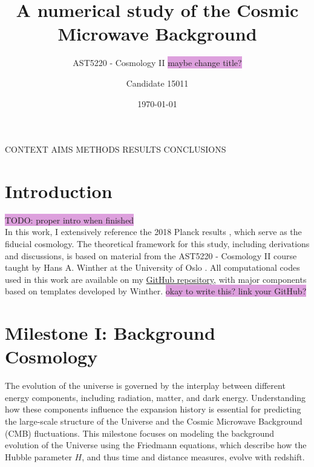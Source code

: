 \documentclass{aa}
\begin{document}
 


   \title{A numerical study of the Cosmic Microwave Background}

   \subtitle{AST5220 - Cosmology II \colorbox{Plum}{maybe change title?}}

   \author{Candidate 15011
          }


   \date{\today}

 
  \abstract

  {CONTEXT}
  {AIMS}
  {METHODS}
  {RESULTS}
  {CONCLUSIONS}

   \maketitle
%
\section{Introduction}\label{sec: introduction}
\colorbox{Plum}{TODO: proper intro when finished} \\

In this work, I extensively reference the 2018 Planck results \citep[see][]{Planck}, which serve as the fiducial cosmology. The theoretical framework for this study, including derivations and discussions, is based on material from the AST5220 - Cosmology II course taught by Hans A. Winther at the University of Oslo \citep[see][]{Course}. All computational codes used in this work are available on my \href{https://github.com/paljettrosa/AST5220}{GitHub repository}, with major components based on templates developed by Winther. \colorbox{Plum}{okay to write this? link your GitHub?}

\section{Milestone I: Background Cosmology}\label{sec: milestone I}
The evolution of the universe is governed by the interplay between different energy components, including radiation, matter, and dark energy. Understanding how these components influence the expansion history is essential for predicting the large-scale structure of the Universe and the Cosmic Microwave Background (CMB) fluctuations. This milestone focuses on modeling the background evolution of the Universe using the Friedmann equations, which describe how the Hubble parameter $H$, and thus time and distance measures, evolve with redshift. 
\end{document}
